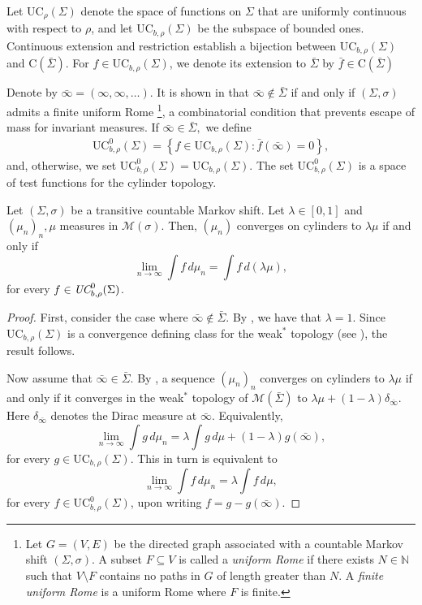 \documentclass[letterpaper,11pt]{amsart}
\numberwithin{equation}{section}     %
\newcommand{\M}{\mathcal{M}}
\def\M{{\mathcal M}}
\def\M{\mathcal{M}}
\begin{document}
Let $\text{UC}_{\rho}(\Sigma)$ denote the space of functions on $\Sigma$ that are uniformly continuous with respect to $\rho$, and let $\text{UC}_{b,\rho}(\Sigma)$ be the subspace of bounded ones. Continuous extension and restriction establish a bijection between $\text{UC}_{b,\rho}(\Sigma)$ and $\text{C}(\bar\Sigma)$. For $f\in\text{UC}_{b,\rho}(\Sigma)$, we denote its extension to $\bar\Sigma$ by $\bar f\in\text{C}(\bar\Sigma)$




Denote by $\bar\infty=(\infty,\infty,\ldots)$. It is shown in \cite[Corollary 3.7]{iv2} that $\bar\infty \notin \bar\Sigma$ if and only if $(\Sigma, \sigma)$ admits  a finite uniform Rome \footnote{Let $G = (V, E)$ be the directed graph associated with a countable Markov shift $(\Sigma, \sigma)$. A subset $F \subseteq V$ is called a \emph{uniform Rome} if there exists $N \in \mathbb{N}$ such that $V \setminus F$ contains no paths in $G$ of length greater than $N$. A \emph{finite uniform Rome} is a uniform Rome where $F$ is finite.}, a combinatorial condition that prevents escape of mass for invariant measures. If $\bar\infty\in \bar\Sigma,$ we define 
\begin{align}\label{eq:test1}
\text{UC}_{b,\rho}^0(\Sigma)=\left\{f\in \text{UC}_{b,\rho}(\Sigma): \bar{f}(\bar \infty)=0 \right\},
\end{align}
and, otherwise, we set $\text{UC}_{b,\rho}^0(\Sigma)= \text{UC}_{b,\rho}(\Sigma)$. The set  $\text{UC}_{b,\rho}^0(\Sigma)$ is a space of test functions for the cylinder topology. 

\begin{lemma}\label{lem:testsigma}
 Let $(\Sigma,\sigma)$ be a transitive countable Markov shift. Let $\lambda\in[0,1]$ and $(\mu_n)_n,\mu$  measures in $\M(\sigma)$. Then, $(\mu_n)$ converges on cylinders to $\lambda\mu$ if and  only if 
 $$\lim_{n\to\infty}\int f \, d\mu_n=\int f \, d(\lambda\mu),$$
for every $f\in \emph{UC}_{b,\rho}^0(\Sigma)$. 
\end{lemma}



\begin{proof} First, consider the case where $\bar\infty \notin \bar\Sigma$. By \cite[Corollary 3.7]{iv2}, we have that $\lambda=1$. Since $ \text{UC}_{b,\rho}(\Sigma)$ is a convergence defining class for the weak$^\ast$ topology (see \cite[Remark 3.1]{iv2}), the result follows.

Now assume that $\bar\infty\in \bar\Sigma$. By \cite[Theorem 3.5]{iv2}, a sequence $(\mu_n)_n$ converges on cylinders to $\lambda\mu$ if and only if it converges in the weak$^\ast$ topology of $\M(\bar\Sigma)$ to $\lambda\mu+(1-\lambda)\delta_{\bar\infty}$. Here $\delta_{\bar\infty}$ denotes the Dirac measure at $\bar\infty$. Equivalently,
$$\lim_{n\to\infty} \int g \, d\mu_n=\lambda\int g \, d\mu+(1-\lambda)g(\bar\infty),$$ 
for every $g\in \text{UC}_{b,\rho}(\Sigma)$. This in turn is equivalent to 
$$\lim_{n\to\infty} \int f \, d\mu_n=\lambda\int f \, d\mu,$$
 for every $f\in \text{UC}^0_{b,\rho}(\Sigma)$, upon writing $f=g-g(\bar\infty)$. 
\end{proof}
\end{document}
